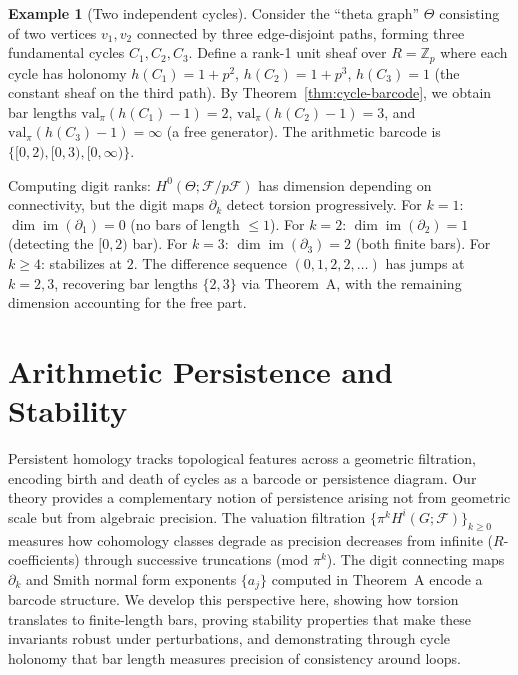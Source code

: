 \documentclass[11pt]{amsart}
\theoremstyle{plain}
\theoremstyle{definition}
\newtheorem{example}[theorem]{Example}
\newcommand{\Zp}{\mathbb{Z}_p}                        %
\newcommand{\valpi}{\mathrm{val}_{\unif}}                   %
\newcommand{\Ring}{R}                          %
\newcommand{\unif}{\pi}                        %
\newcommand{\sheaf}[1]{\mathcal{#1}}                  %
\newcommand{\Digit}[1]{\partial_{#1}}%
\DeclareMathOperator{\im}{im}                         %
\begin{document}
\begin{example}[Two independent cycles]
\label{ex:two-cycles}
Consider the ``theta graph'' $\Theta$ consisting of two vertices $v_1, v_2$ connected by three edge-disjoint paths, forming three fundamental cycles $C_1, C_2, C_3$. Define a rank-1 unit sheaf over $\Ring = \Zp$ where each cycle has holonomy $h(C_1) = 1 + p^2$, $h(C_2) = 1 + p^3$, $h(C_3) = 1$ (the constant sheaf on the third path). By Theorem~\ref{thm:cycle-barcode}, we obtain bar lengths $\valpi(h(C_1)-1) = 2$, $\valpi(h(C_2)-1) = 3$, and $\valpi(h(C_3)-1) = \infty$ (a free generator). The arithmetic barcode is $\{[0,2), [0,3), [0,\infty)\}$.

Computing digit ranks: $H^0(\Theta;\sheaf{F}/p\sheaf{F})$ has dimension depending on connectivity, but the digit maps $\Digit{k}$ detect torsion progressively. For $k=1$: $\dim \im(\Digit{1}) = 0$ (no bars of length $\le 1$). For $k=2$: $\dim \im(\Digit{2}) = 1$ (detecting the $[0,2)$ bar). For $k=3$: $\dim \im(\Digit{3}) = 2$ (both finite bars). For $k \ge 4$: stabilizes at $2$. The difference sequence $(0,1,2,2,\ldots)$ has jumps at $k=2,3$, recovering bar lengths $\{2,3\}$ via Theorem~A, with the remaining dimension accounting for the free part.
\end{example}


\section{Arithmetic Persistence and Stability}
\label{sec:barcodes}

Persistent homology tracks topological features across a geometric filtration, encoding birth and death of cycles as a barcode or persistence diagram. Our theory provides a complementary notion of persistence arising not from geometric scale but from algebraic precision. The valuation filtration $\{\unif^k H^i(G;\sheaf{F})\}_{k\ge 0}$ measures how cohomology classes degrade as precision decreases from infinite ($\Ring$-coefficients) through successive truncations (mod $\unif^k$). The digit connecting maps $\Digit{k}$ and Smith normal form exponents $\{a_j\}$ computed in Theorem~A encode a barcode structure. We develop this perspective here, showing how torsion translates to finite-length bars, proving stability properties that make these invariants robust under perturbations, and demonstrating through cycle holonomy that bar length measures precision of consistency around loops.
\end{document}
